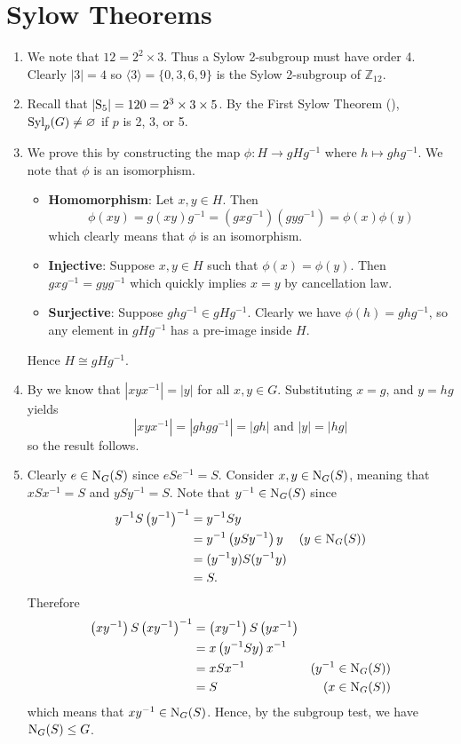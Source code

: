 \section{Sylow Theorems}
\begin{enumerate}
    \item We note that $12 = 2^2 \times 3$. Thus a Sylow 2-subgroup must have order 4. Clearly $|3| = 4$ so $\langle 3 \rangle = \{0, 3, 6, 9\}$ is the Sylow 2-subgroup of $\mathbb{Z}_{12}$.

    \item Recall that $|\mathrm{S}_{5}| = 120 = 2^3 \times 3 \times 5$. By the First Sylow Theorem (), $\mathrm{Syl}_{p}(G) \neq \varnothing$ if $p$ is 2, 3, or 5.

    \item We prove this by constructing the map $\phi: H \to gHg^{-1}$ where $h \mapsto ghg^{-1}$. We note that $\phi$ is an isomorphism.
    \begin{itemize}
        \item \textbf{Homomorphism}: Let $x, y \in H$. Then
        \[
            \phi(xy) = g(xy)g^{-1} = (gxg^{-1})(gyg^{-1}) = \phi(x)\phi(y)
        \]
        which clearly means that $\phi$ is an isomorphism.
        \item \textbf{Injective}: Suppose $x, y \in H$ such that $\phi(x) = \phi(y)$. Then $gxg^{-1} = gyg^{-1}$ which quickly implies $x = y$ by cancellation law.
        \item \textbf{Surjective}: Suppose $ghg^{-1} \in gHg^{-1}$. Clearly we have $\phi(h) = ghg^{-1}$, so any element in $gHg^{-1}$ has a pre-image inside $H$.
    \end{itemize}
    Hence $H \cong gHg^{-1}$.

    \item By  we know that $|xyx^{-1}| = |y|$ for all $x, y \in G$. Substituting $x = g$, and $y = hg$ yields
    \[
        |xyx^{-1}| = |ghgg^{-1}| = |gh| \text{ and } |y| = |hg|
    \]
    so the result follows.

    \item Clearly $e \in \mathrm{N}_{G}(S)$ since $eSe^{-1} = S$. Consider $x, y \in \mathrm{N}_{G}(S)$, meaning that $xSx^{-1} = S$ and $ySy^{-1} = S$. Note that $y^{-1} \in \mathrm{N}_{G}(S)$ since
    \begin{align*}
        y^{-1}S\left(y^{-1}\right)^{-1} &= y^{-1}Sy\\
        &= y^{-1}\left(ySy^{-1}\right)y & (y \in \mathrm{N}_{G}(S))\\
        &= (y^{-1}y)S(y^{-1}y)\\
        &= S.
    \end{align*}
    Therefore
    \begin{align*}
        \left(xy^{-1}\right)S\left(xy^{-1}\right)^{-1} &= \left(xy^{-1}\right)S\left(yx^{-1}\right)\\
        &= x\left(y^{-1}Sy\right)x^{-1}\\
        &= xSx^{-1} & (y^{-1} \in \mathrm{N}_{G}(S))\\
        &= S & (x \in \mathrm{N}_{G}(S))
    \end{align*}
    which means that $xy^{-1} \in \mathrm{N}_{G}(S)$. Hence, by the subgroup test, we have $\mathrm{N}_{G}(S) \leq G$.


\end{enumerate}
